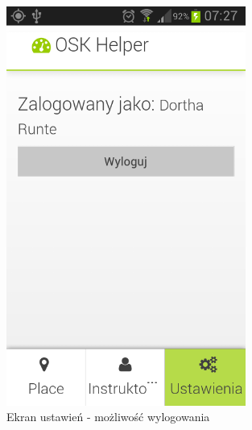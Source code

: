 \documentclass[twoside,a4paper,openright,12pt]{book}
\begin{document}
\begin{figure}[htbp]
\centering
\includegraphics[width=0.7\textwidth]{screenshots/android/ustawienia.png}
\caption{Ekran ustawień - możliwość wylogowania}
\end{figure}
\end{document}
